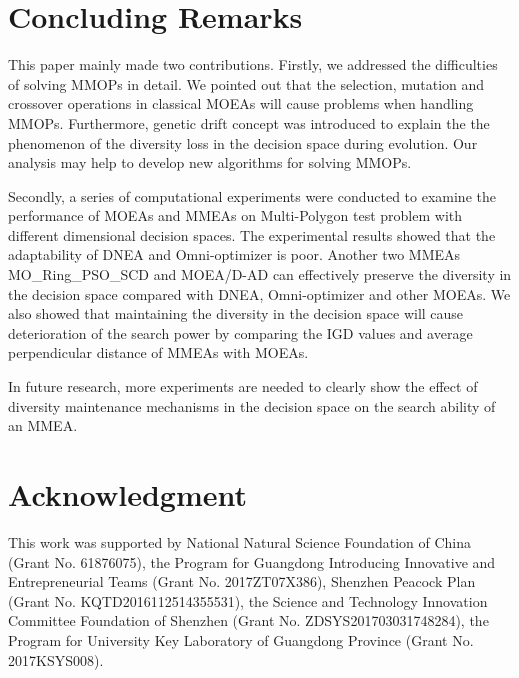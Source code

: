 \documentclass[conference]{IEEEtran}
\begin{document}
\section{Concluding Remarks}
\label{Conclusion}
This paper mainly made two contributions. Firstly, we addressed the difficulties of solving MMOPs in detail. We pointed out that the selection, mutation and crossover operations in classical MOEAs will cause problems when handling MMOPs. Furthermore, genetic drift concept was introduced to explain the the phenomenon of the diversity loss in the decision space during evolution. Our analysis may help to develop new algorithms for solving MMOPs.

Secondly, a series of computational experiments were conducted to examine the performance of MOEAs and MMEAs on Multi-Polygon test problem with different dimensional decision spaces. The experimental results showed that the adaptability of DNEA and Omni-optimizer is poor. Another two MMEAs MO\_Ring\_PSO\_SCD and MOEA/D-AD can effectively preserve the diversity in the decision space compared with DNEA, Omni-optimizer and other MOEAs. We also showed that maintaining the diversity in the decision space will cause deterioration of the search power by comparing the IGD values and average perpendicular distance of MMEAs with MOEAs. 

In future research, more experiments are needed to clearly show the effect of diversity maintenance mechanisms in the decision space on the search ability of an MMEA.

\section*{Acknowledgment}
This work was supported by National Natural Science Foundation of China (Grant No. 61876075), the Program for Guangdong Introducing Innovative and Entrepreneurial Teams (Grant No. 2017ZT07X386), Shenzhen Peacock Plan (Grant No. KQTD2016112514355531), the Science and Technology Innovation Committee Foundation of Shenzhen (Grant No. ZDSYS201703031748284), the Program for University Key Laboratory of Guangdong Province (Grant No. 2017KSYS008).


\end{document}
